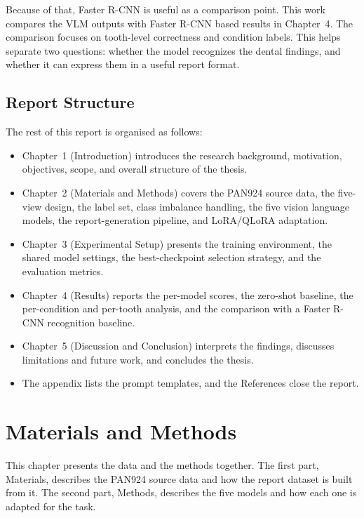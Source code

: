 \documentclass[a4paper,12pt]{report}
\begin{document}
Because of that, Faster R-CNN is useful as a comparison point. This work compares the VLM outputs with Faster R-CNN based results in Chapter~4. The comparison focuses on tooth-level correctness and condition labels. This helps separate two questions: whether the model recognizes the dental findings, and whether it can express them in a useful report format.

\section{Report Structure}

The rest of this report is organised as follows:

\begin{itemize}
\item Chapter~1 (Introduction) introduces the research background, motivation, objectives, scope, and overall structure of the thesis.

\item Chapter~2 (Materials and Methods) covers the PAN924 source data, the five-view design, the label set, class imbalance handling, the five vision language models, the report-generation pipeline, and LoRA/QLoRA adaptation.

\item Chapter~3 (Experimental Setup) presents the training environment, the shared model settings, the best-checkpoint selection strategy, and the evaluation metrics.

\item Chapter~4 (Results) reports the per-model scores, the zero-shot baseline, the per-condition and per-tooth analysis, and the comparison with a Faster R-CNN recognition baseline.

\item Chapter~5 (Discussion and Conclusion) interprets the findings, discusses limitations and future work, and concludes the thesis.

\item The appendix lists the prompt templates, and the References close the report.

\end{itemize}


\chapter{Materials and Methods}

This chapter presents the data and the methods together. The first part, Materials, describes the PAN924 source data and how the report dataset is built from it. The second part, Methods, describes the five models and how each one is adapted for the task.
\end{document}
